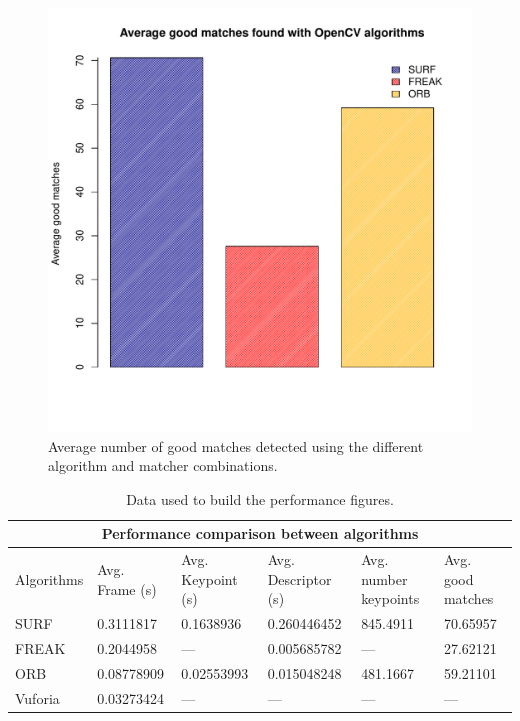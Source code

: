 \begin{figure}
\centering
\includegraphics[scale=0.75]{performance/goodmatches.pdf}
\caption{\label{fig:goodmatches} Average number of good matches detected using the
  different algorithm and matcher combinations.}
\end{figure} 

\begin{center}
\renewcommand{\arraystretch}{1.5}
\begin{table}
\begin{tabular}{|l|p{2.05cm}|p{1.9cm}|p{2cm}|p{1.85cm}|p{1.9cm}|}
\hline\hline
\multicolumn{6}{|c|}{\large\bfseries Performance comparison between algorithms}
\\ \hline
\sffamily Algorithms & \sffamily Avg. Frame (s) & \sffamily Avg. Keypoint (s) &
\sffamily Avg. Descriptor (s) & \sffamily Avg. number
keypoints & \sffamily Avg. good matches \\ \hline
SURF & 0.3111817 & 0.1638936 & 0.260446452 & 845.4911 & 70.65957 \\ \hline
FREAK & 0.2044958 & --- & 0.005685782 & --- & 27.62121 \\ \hline
ORB & 0.08778909 & 0.02553993 & 0.015048248 & 481.1667 & 59.21101 \\ \hline
Vuforia & 0.03273424 & --- & --- & --- & --- \\ \hline\hline
\end{tabular}
\caption{Data used to build the performance figures.}
\end{table}
\end{center}

